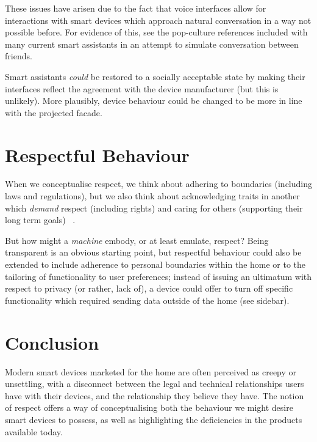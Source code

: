 \documentclass{sigchi-ext}
\begin{document}
These issues have arisen due to the fact that voice interfaces allow for interactions with smart devices which approach natural conversation in a way not possible before. For evidence of this, see the pop-culture references included with many current smart assistants in an attempt to simulate conversation between friends.

Smart assistants \textit{could} be restored to a socially acceptable state by making their interfaces reflect the agreement with the device manufacturer (but this is unlikely). More plausibly, device behaviour could be changed to be more in line with the projected facade.

\section{Respectful Behaviour}
When we conceptualise respect, we think about adhering to boundaries (including laws and regulations), but we also think about acknowledging traits in another which \textit{demand} respect (including rights) and caring for others (supporting their long term goals) ~\cite{sep-respect}.

But how might a \textit{machine} embody, or at least emulate, respect? Being transparent is an obvious starting point, but respectful behaviour could also be extended to include adherence to personal boundaries within the home or to the tailoring of functionality to user preferences; instead of issuing an ultimatum with respect to privacy (or rather, lack of), a device could offer to turn off specific functionality which required sending data outside of the home (see sidebar).


\section{Conclusion}
Modern smart devices marketed for the home are often perceived as creepy or unsettling, with a disconnect between the legal and technical relationships users have with their devices, and the relationship they believe they have. The notion of respect offers a way of conceptualising both the behaviour we might desire smart devices to possess, as well as highlighting the deficiencies in the products available today.

\balance{} 



\end{document}
